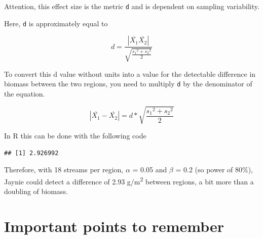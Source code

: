 \documentclass[
  12pt,
]{book}
\makeatletter
\newenvironment{Shaded}{\begin{snugshade}}{\end{snugshade}}
\newcommand{\DataTypeTok}[1]{\textcolor[rgb]{0.13,0.29,0.53}{#1}}
\newcommand{\DecValTok}[1]{\textcolor[rgb]{0.00,0.00,0.81}{#1}}
\newcommand{\FloatTok}[1]{\textcolor[rgb]{0.00,0.00,0.81}{#1}}
\newcommand{\KeywordTok}[1]{\textcolor[rgb]{0.13,0.29,0.53}{\textbf{#1}}}
\newcommand{\NormalTok}[1]{#1}
\newcommand{\OperatorTok}[1]{\textcolor[rgb]{0.81,0.36,0.00}{\textbf{#1}}}
\newcommand{\StringTok}[1]{\textcolor[rgb]{0.31,0.60,0.02}{#1}}
\newenvironment{kframe}{%
\medskip{}
\setlength{\fboxsep}{.8em}
\def\at@end@of@kframe{}%
\ifinner\ifhmode%
 \def\at@end@of@kframe{\end{minipage}}%
 \begin{minipage}{\columnwidth}%
\fi\fi%
\def\FrameCommand##1{\hskip\@totalleftmargin \hskip-\fboxsep
\colorbox{incolor}{##1}\hskip-\fboxsep
    \hskip-\linewidth \hskip-\@totalleftmargin \hskip\columnwidth}%
\MakeFramed {\advance\hsize-\width
  \@totalleftmargin\z@ \linewidth\hsize
  \@setminipage}}%
{\par\unskip\endMakeFramed%
\at@end@of@kframe}
\newenvironment{rmdblock}[1]
 {
 \begin{itemize}
 \renewcommand{\labelitemi}{
   \raisebox{-.7\height}[0pt][0pt]{
     {\setkeys{Gin}{width=3em,keepaspectratio}\texttt{[image: images/\#1]}}
   }
 }
 \begin{kframe}
 \setlength{\fboxsep}{1em}
 \item
 }
 {
 \end{kframe}
 \end{itemize}
 }
\newenvironment{rmdcaution}
  {\begin{rmdblock}{caution}}
  {\end{rmdblock}}
\makeatother
\begin{document}
\begin{rmdcaution}
Attention, this effect size is the metric \texttt{d} and is dependent on sampling variability.
\end{rmdcaution}

Here, \texttt{d} is approximately equal to

\[ d = \frac{| \bar{X_1} \bar{X_2} |} {\sqrt{\frac{{s_1}^2 +{s_2}^2}{2}}}\]

To convert this d value without units into a value for the detectable difference in biomass between the two regions, you need to multiply \texttt{d} by the denominator of the equation.

\[
| \bar{X_1} - \bar{X_2} | = d * \sqrt{\frac{{s_1}^2 +{s_2}^2}{2}}
\]

In R this can be done with the following code

\begin{Shaded}
\end{Shaded}

\begin{verbatim}
## [1] 2.926992
\end{verbatim}

Therefore, with 18 streams per region, \(\alpha\) = 0.05 and \(\beta\) = 0.2 (so power of 80\%), Jaynie could detect a difference of 2.93 g/m\textsuperscript{2} between regions, a bit more than a doubling of biomass.

\hypertarget{important-points-to-remember}{%
\section{Important points to remember}\label{important-points-to-remember}}
\end{document}
